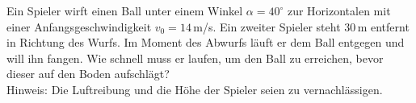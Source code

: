 \begin{ExerciseBlock}
Ein Spieler wirft einen Ball unter einem Winkel $\alpha = 40^\circ$ zur  Horizontalen mit einer Anfangsgeschwindigkeit $v_0 = 14 \,$m/s. Ein zweiter Spieler steht $30\,$m entfernt in Richtung des Wurfs. Im Moment des Abwurfs läuft er dem Ball entgegen und will ihn fangen. Wie schnell muss er laufen, um den Ball zu erreichen, bevor dieser auf den Boden aufschlägt? \\

Hinweis: Die Luftreibung und die Höhe der Spieler seien zu vernachlässigen.
\end{ExerciseBlock}
